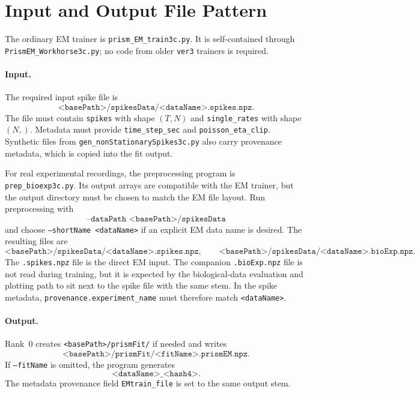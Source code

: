 \documentclass[11pt]{article}
\begin{document}
\section{Input and Output File Pattern}
\label{sec:io}

The ordinary EM trainer is \texttt{prism\_EM\_train3c.py}. It is self-contained
through \texttt{PrismEM\_Workhorse3c.py}; no code from older
\texttt{ver3} trainers is required.

\paragraph{Input.}
The required input spike file is
\[
\texttt{<basePath>/spikesData/<dataName>.spikes.npz}.
\]
The file must contain \texttt{spikes} with shape \((T,N)\) and
\texttt{single\_rates} with shape \((N,)\). Metadata must provide
\texttt{time\_step\_sec} and \texttt{poisson\_eta\_clip}. Synthetic files
from \texttt{gen\_nonStationarySpikes3c.py} also carry provenance metadata,
which is copied into the fit output.

For real experimental recordings, the preprocessing program is
\texttt{prep\_bioexp3c.py}. Its output arrays are compatible with the EM
trainer, but the output directory must be chosen to match the EM file
layout. Run preprocessing with
\[
\texttt{--dataPath <basePath>/spikesData}
\]
and choose \texttt{--shortName <dataName>} if an explicit EM data name is
desired. The resulting files are
\[
\texttt{<basePath>/spikesData/<dataName>.spikes.npz},
\qquad
\texttt{<basePath>/spikesData/<dataName>.bioExp.npz}.
\]
The \texttt{.spikes.npz} file is the direct EM input. The companion
\texttt{.bioExp.npz} file is not read during training, but it is expected by
the biological-data evaluation and plotting path to sit next to the spike
file with the same stem. In the spike metadata,
\texttt{provenance.experiment\_name} must therefore match
\texttt{<dataName>}.

\paragraph{Output.}
Rank~0 creates \texttt{<basePath>/prismFit/} if needed and writes
\[
\texttt{<basePath>/prismFit/<fitName>.prismEM.npz}.
\]
If \texttt{--fitName} is omitted, the program generates
\[
\texttt{<dataName>\_<hash4>}.
\]
The metadata provenance field \texttt{EMtrain\_file} is set to the same
output stem.
\end{document}

